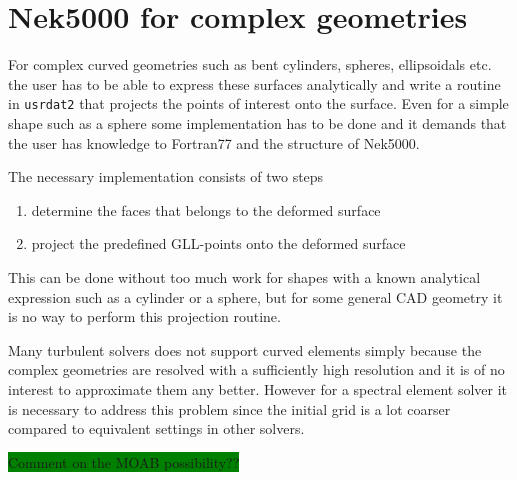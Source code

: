 \section{Nek5000 for complex geometries}
For complex curved geometries such as bent cylinders, spheres, ellipsoidals etc.
the user has to be able to express these surfaces analytically and write a routine
in \verb|usrdat2| that projects the points of interest onto the surface.
Even for a simple shape such as a sphere some implementation has to be done and it 
demands that the user has knowledge to Fortran77 and the structure of Nek5000.

The necessary implementation consists of two steps 
%
\begin{enumerate}
    \item determine the faces that belongs to the deformed surface
    \item project the predefined GLL-points onto the deformed surface
\end{enumerate}
%
This can be done without too much work for shapes with a known analytical 
expression such as a cylinder or a sphere, but for some general CAD geometry 
it is no way to perform this projection routine. 

Many turbulent solvers does not support curved elements simply because the 
complex geometries are resolved with a sufficiently high resolution and it 
is of no interest to approximate them any better. However for a spectral element
solver it is necessary to address this problem since the initial grid is a lot coarser
compared to equivalent settings in other solvers.

\colorbox{green}{Comment on the MOAB possibility??}

